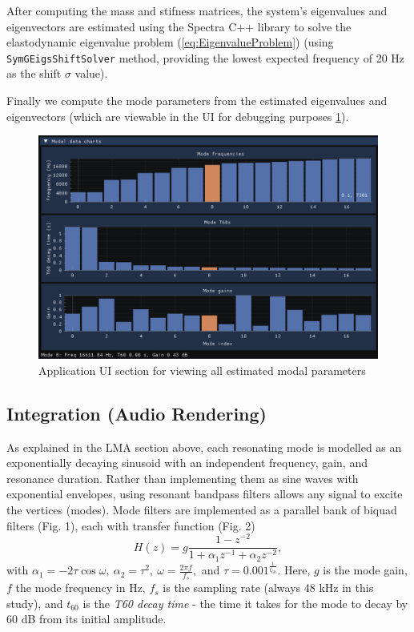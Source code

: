 \documentclass[12pt]{article}
\begin{document}
After computing the mass and stifness matrices, the system's eigenvalues and eigenvectors are estimated using the Spectra C++ library \cite{spectra} to solve the elastodynamic eigenvalue problem (\ref{eq:EigenvalueProblem}) (using \verb|SymGEigsShiftSolver| method, providing the lowest expected frequency of 20 Hz as the shift $\sigma$ value).

Finally we compute the mode parameters from the estimated eigenvalues and eigenvectors (which are viewable in the UI for debugging purposes \ref{fig:ModeDebugUI}).

\begin{figure}
  \centering
  \includegraphics[width=0.5\linewidth]{images/ModalDebugUI.png}
  \caption{Application UI section for viewing all estimated modal parameters}
  \label{fig:ModeDebugUI}
\end{figure}

\subsection{Integration (Audio Rendering)}

As explained in the LMA section above, each resonating mode is modelled as an exponentially decaying sinusoid with an independent frequency, gain, and resonance duration.
Rather than implementing them as sine waves with exponential envelopes, using resonant bandpass filters allows any signal to excite the vertices (modes).
Mode filters are implemented as a parallel bank of biquad filters (Fig. 1), each with transfer function (Fig. 2)
\begin{equation}\label{eq:1}
H(z) = g\frac{1-z^{-2}}{1+\alpha_1z^{-1}+\alpha_2z^{-2}},
\end{equation}
with $\alpha_1 = -2\tau \cos\omega ,\ \alpha_2 = \tau^2,\ \omega = \frac{2\pi f}{f_s},$ and $\tau = 0.001^{\frac{1}{t_{60}}}.$
Here, $g$ is the mode gain, $f$ the mode frequency in Hz, $f_s$ is the sampling rate (always 48 kHz in this study), and $t_{60}$ is the \textit{T60 decay time} - the time it takes for the mode to decay by 60 dB from its initial amplitude.
\end{document}

